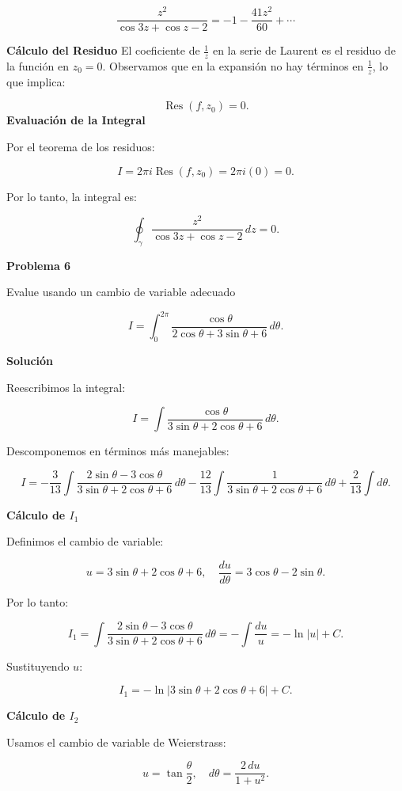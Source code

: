 \documentclass[a4paper,12pt]{article}
\begin{document}
\[
\frac{z^{2}}{\cos 3z + \cos z - 2} = -1 - \frac{41z^{2}}{60} + \cdots
\]


{\bf Cálculo del Residuo}
El coeficiente de \( \frac{1}{z} \) en la serie de Laurent es el residuo de la función en \( z_0 = 0 \). Observamos que en la expansión no hay términos en \( \frac{1}{z} \), lo que implica:

\[
\operatorname{Res}(f, z_0) = 0.
\]
{\bf Evaluación de la Integral}

Por el teorema de los residuos:

\[
I = 2 \pi i \operatorname{Res}(f, z_0) = 2 \pi i (0) = 0.
\]

Por lo tanto, la integral es:

\[
\oint_{\gamma} \frac{z^{2}}{\cos 3z + \cos z - 2} \, dz = 0.
\]


{\bf Problema 6}

Evalue usando un cambio de variable adecuado

\[
I = \int_{0}^{2 \pi} \frac{\cos \theta}{2 \cos \theta + 3 \sin \theta + 6} \, d\theta.
\]

{\bf Solución}

Reescribimos la integral:

\[
I = \int \frac{\cos \theta}{3 \sin \theta + 2 \cos \theta + 6} \, d\theta.
\]

Descomponemos en términos más manejables:

\[
I = -\frac{3}{13} \int \frac{2 \sin \theta - 3 \cos \theta}{3 \sin \theta + 2 \cos \theta + 6} \, d\theta
-\frac{12}{13} \int \frac{1}{3 \sin \theta + 2 \cos \theta + 6} \, d\theta
+ \frac{2}{13} \int d\theta.
\]

{\bf Cálculo de \(I_1\)}

Definimos el cambio de variable:

\[
u = 3 \sin \theta + 2 \cos \theta + 6, \quad \frac{du}{d\theta} = 3 \cos \theta - 2 \sin \theta.
\]

Por lo tanto:

\[
I_1 = \int \frac{2 \sin \theta - 3 \cos \theta}{3 \sin \theta + 2 \cos \theta + 6} \, d\theta
= -\int \frac{du}{u} = -\ln |u| + C.
\]

Sustituyendo \( u \):

\[
I_1 = -\ln |3 \sin \theta + 2 \cos \theta + 6| + C.
\]

{\bf Cálculo de \(I_2\)}

Usamos el cambio de variable de Weierstrass:

\[
u = \tan \frac{\theta}{2}, \quad d\theta = \frac{2 \, du}{1+u^2}.
\]
\end{document}

